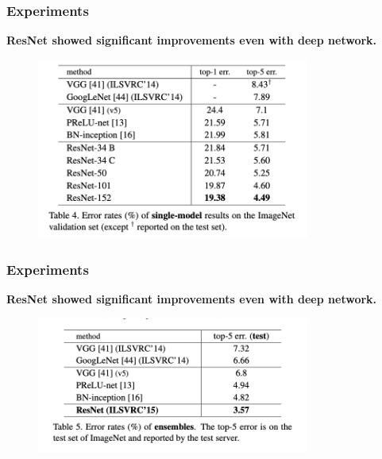 \documentclass[
	11pt, %
]{beamer}
\begin{document}
\begin{frame}
	\frametitle{Experiments}

	\textbf{ResNet showed significant improvements even with deep network.}

	\begin{figure}
		\centering
		\includegraphics[width=0.8\textwidth]{./images/Screenshot 2025-05-20 at 0.34.11.png}
	\end{figure}
\end{frame}

\begin{frame}
	\frametitle{Experiments}

	\textbf{ResNet showed significant improvements even with deep network.}

	\begin{figure}
		\centering
		\includegraphics[width=0.8\textwidth]{./images/Screenshot 2025-05-20 at 0.34.30.png}
	\end{figure}
\end{frame}
\end{document}
